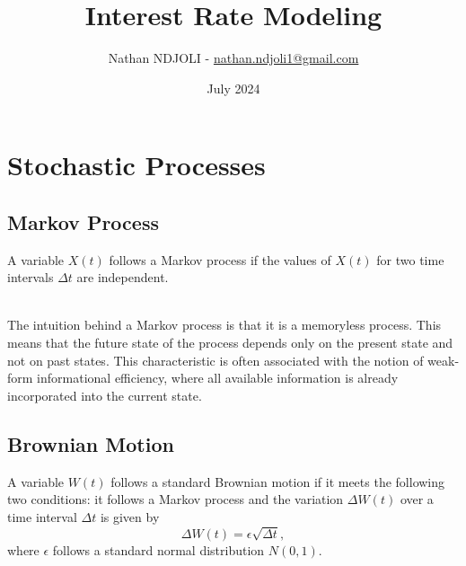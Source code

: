 \documentclass[a4paper,10pt]{article}
\title{Interest Rate Modeling}
\author{Nathan NDJOLI - \href{mailto:nathan.ndjoli1@gmail.com}{nathan.ndjoli1@gmail.com}}
\date{July 2024}
\begin{document}
\maketitle

\section{Stochastic Processes}
\subsection{Markov Process}
\noindent A variable \( X(t) \) follows a Markov process if the values of \( X(t) \) for two time intervals \( \Delta t \) are independent. \\

\\

\noindent The intuition behind a Markov process is that it is a memoryless process. This means that the future state of the process depends only on the present state and not on past states. This characteristic is often associated with the notion of weak-form informational efficiency, where all available information is already incorporated into the current state. \\

\subsection{Brownian Motion}
\noindent A variable \( W(t) \) follows a standard Brownian motion if it meets the following two conditions: it follows a Markov process and the variation \( \Delta W(t) \) over a time interval \( \Delta t \) is given by \[ \Delta W(t) = \epsilon \sqrt{\Delta t}, \] where \( \epsilon \) follows a standard normal distribution \( N(0, 1) \). \\
\end{document}
